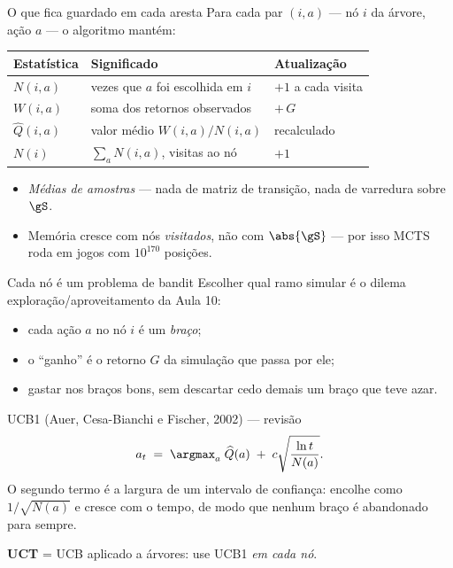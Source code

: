 \documentclass[aspectratio=169, 11pt]{beamer}
\newcommand{\Nv}[1]{N(#1)}                      %
\newcommand{\Qh}{\widehat{Q}}                   %
\newcommand{\ret}{G}                            %
\begin{document}
\begin{frame}{O que fica guardado em cada aresta}
  Para cada par $(i,a)$ --- nó $i$ da árvore, ação $a$ --- o algoritmo mantém:

  \vspace{0.4em}
  \centering
  \begin{tabular}{@{}lll@{}}
    \toprule
    \textbf{Estatística} & \textbf{Significado} & \textbf{Atualização} \\
    \midrule
    $\Nv{i,a}$ & vezes que $a$ foi escolhida em $i$ & $+1$ a cada visita \\
    $W(i,a)$   & soma dos retornos observados       & $+\,\ret$ \\
    $\Qh(i,a)$ & valor médio $W(i,a)/\Nv{i,a}$      & recalculado \\
    $\Nv{i}$   & $\sum_a \Nv{i,a}$, visitas ao nó   & $+1$ \\
    \bottomrule
  \end{tabular}

  \vfill
  \raggedright
  \begin{itemize}
    \item \emph{Médias de amostras} --- nada de matriz de transição, nada de varredura sobre $\gS$.
    \item Memória cresce com nós \emph{visitados}, não com $\abs{\gS}$ — por isso MCTS roda em jogos com $10^{170}$ posições.
  \end{itemize}
\end{frame}

\begin{frame}{Cada nó é um problema de bandit}
  Escolher qual ramo simular é o dilema exploração/aproveitamento da Aula 10:

  \begin{itemize}
    \item cada ação $a$ no nó $i$ é um \emph{braço};
    \item o ``ganho'' é o retorno $\ret$ da simulação que passa por ele;
    \item gastar nos braços bons, sem descartar cedo demais um braço que teve azar.
  \end{itemize}

  \pause
  \begin{teobox}{UCB1 (Auer, Cesa-Bianchi e Fischer, 2002) --- revisão}
    \[
      a_t \;=\; \argmax_{a}\; \Qh(a) \;+\; c\sqrt{\frac{\ln t}{N(a)}} .
    \]
    O segundo termo é a largura de um intervalo de confiança: encolhe como
    $1/\sqrt{N(a)}$ e cresce com o tempo, de modo que nenhum braço é abandonado
    para sempre.
  \end{teobox}

  \pause
  \textbf{UCT} = UCB aplicado a árvores: use UCB1 \emph{em cada nó}.
\end{frame}
\end{document}
